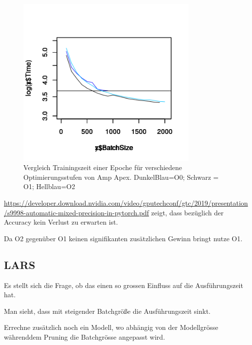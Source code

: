 \begin{figure}[h]
 \centering
 \includegraphics[width=0.8\textwidth]{KapitelPartB/Images/timeVsBatchSize_Amp.png}
 \caption{Vergleich Trainingszeit einer Epoche für verschiedene Optimierungsstufen von Amp Apex. DunkelBlau=O0; Schwarz = O1; Hellblau=O2}
 \label{fig:amp}
\end{figure}
\url{https://developer.download.nvidia.com/video/gputechconf/gtc/2019/presentation/s9998-automatic-mixed-precision-in-pytorch.pdf} zeigt, dass bezüglich der Accuracy kein Verlust zu erwarten ist.

Da O2 gegenüber O1 keinen signifikanten zusätzlichen Gewinn bringt nutze O1.



\subsection{LARS}\label{sec:lars}




Es stellt sich die Frage, ob das einen so grossen Einfluss auf die Ausführungszeit hat.



Man sieht, dass mit steigender Batchgröße die Ausführungszeit sinkt. 

Errechne zusätzlich noch ein Modell, wo abhängig von der Modellgrösse währenddem Pruning die Batchgrösse angepasst wird.






